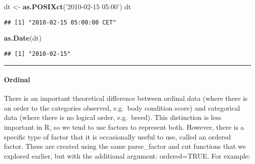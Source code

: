 \documentclass[
]{article}
\newenvironment{Shaded}{\begin{snugshade}}{\end{snugshade}}
\newcommand{\KeywordTok}[1]{\textcolor[rgb]{0.13,0.29,0.53}{\textbf{#1}}}
\newcommand{\NormalTok}[1]{#1}
\newcommand{\StringTok}[1]{\textcolor[rgb]{0.31,0.60,0.02}{#1}}
\begin{document}
\begin{Shaded}
\begin{Highlighting}[]
\NormalTok{dt <-}\StringTok{ }\KeywordTok{as.POSIXct}\NormalTok{(}\StringTok{'2010-02-15 05:00'}\NormalTok{)}
\NormalTok{dt}
\end{Highlighting}
\end{Shaded}

\begin{verbatim}
## [1] "2010-02-15 05:00:00 CET"
\end{verbatim}

\begin{Shaded}
\begin{Highlighting}[]
\KeywordTok{as.Date}\NormalTok{(dt)}
\end{Highlighting}
\end{Shaded}

\begin{verbatim}
## [1] "2010-02-15"
\end{verbatim}

\begin{center}\rule{0.5\linewidth}{0.5pt}\end{center}

\hypertarget{ordinal}{%
\paragraph{Ordinal}\label{ordinal}}

There is an important theoretical difference between ordinal data (where
there is an order to the categories observed, e.g.~body condition score)
and categorical data (where there is no logical order, e.g.~breed). This
distinction is less important in R, so we tend to use factors to
represent both. However, there is a specific type of factor that it is
occasionally useful to use, called an ordered factor. These are created
using the same parse\_factor and cut functions that we explored earlier,
but with the additional argument: ordered=TRUE. For example:
\end{document}

